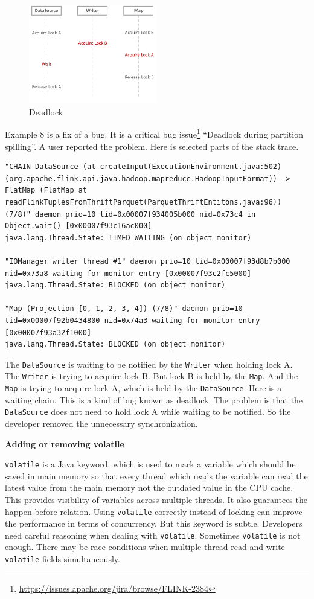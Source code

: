 \begin{figure}
	\centering
	\includegraphics[height=1.7in]{deadlock}
	\caption{Deadlock}
\end{figure}

Example 8 is a fix of a bug. It is a critical bug issue\footnote{\url{https://issues.apache.org/jira/browse/FLINK-2384}} ``Deadlock during partition spilling''. A user reported the problem. Here is selected parts of the stack trace.

\begin{lstlisting}
"CHAIN DataSource (at createInput(ExecutionEnvironment.java:502) (org.apache.flink.api.java.hadoop.mapreduce.HadoopInputFormat)) -> FlatMap (FlatMap at readFlinkTuplesFromThriftParquet(ParquetThriftEntitons.java:96)) (7/8)" daemon prio=10 tid=0x00007f934005b000 nid=0x73c4 in Object.wait() [0x00007f93c16ac000]
java.lang.Thread.State: TIMED_WAITING (on object monitor)

"IOManager writer thread #1" daemon prio=10 tid=0x00007f93d8b7b000 nid=0x73a8 waiting for monitor entry [0x00007f93c2fc5000]
java.lang.Thread.State: BLOCKED (on object monitor)

"Map (Projection [0, 1, 2, 3, 4]) (7/8)" daemon prio=10 tid=0x00007f92b0434800 nid=0x74a3 waiting for monitor entry [0x00007f93a32f1000]
java.lang.Thread.State: BLOCKED (on object monitor)
\end{lstlisting}

The \texttt{DataSource} is waiting to be notified by the \texttt{Writer} when holding lock A. The \texttt{Writer} is trying to acquire lock B. But lock B is held by the \texttt{Map}. And the \texttt{Map} is trying to acquire lock A, which is held by the \texttt{DataSource}. Here is a waiting chain. This is a kind of bug known as deadlock. The problem is that the \texttt{DataSource} does not need to hold lock A while waiting to be notified. So the developer removed the unnecessary synchronization.

\textbf{Adding or removing volatile}

\texttt{volatile} is a Java keyword, which is used to mark a variable which should be saved in main memory so that every thread which reads the variable can read the latest value from the main memory not the outdated value in the CPU cache. This provides visibility of variables across multiple threads. It also guarantees the happen-before relation. Using \texttt{volatile} correctly instead of locking can improve the performance in terms of concurrency. But this keyword is subtle. Developers need careful reasoning when dealing with \texttt{volatile}. Sometimes \texttt{volatile} is not enough. There may be race conditions when multiple thread read and write \texttt{volatile} fields simultaneously.

